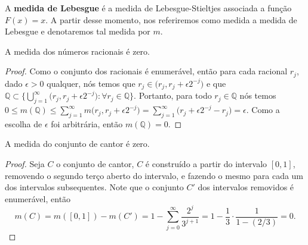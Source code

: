 \begin{definicao}
    A \textbf{medida de Lebesgue} é a medida de Lebesgue-Stieltjes associada a função $F(x)=x$. A partir desse momento, nos referiremos como medida a medida de Lebesgue e denotaremos tal medida por $m$. 
\end{definicao}

\begin{exemplo}
    A medida dos números racionais é zero.
    \begin{proof}
       Como o conjunto dos racionais é enumerável, então para cada racional $r_j$, dado $\epsilon>0$ qualquer, nós temos que $r_j \in \big(r_j,r_j + \epsilon 2^{-j} \big)$ e que $\mathbb{Q} \subset \bigg\{ \bigcup _{j=1} ^\infty \big(r_j,r_j + \epsilon 2^{-j} \big) : \forall r_j \in \mathbb{Q} \bigg\}$. Portanto, para todo $r_j \in \mathbb{Q}$ nós temos $0 \leq m (\mathbb{Q}) \leq \sum _{j=1}^\infty m \big(r_j,r_j + \epsilon 2^{-j} \big) = \sum _{j=1}^\infty \big( r_j + \epsilon 2^{-j} - r_j \big) = \epsilon$. Como a escolha de $\epsilon$ foi arbitrária, então $m(\mathbb{Q}) = 0$. 
    \end{proof}
\end{exemplo}

\begin{exemplo}
    A medida do conjunto de cantor é zero.
    \begin{proof}
        Seja $C$ o conjunto de cantor, $C$ é construído a partir do intervalo $[0,1]$, removendo o segundo terço aberto do intervalo, e fazendo o mesmo para cada um dos intervalos subsequentes. Note que o conjunto $C'$ dos intervalos removidos é enumerável, então
        \[
        m(C) = m([0,1]) - m(C') = 1 - \sum_{j=0}^\infty \frac{2^j}{3^{j+1}} = 1 - \frac{1}{3} \cdot \frac{1}{1- (2/3)} = 0.   
        \]  
    \end{proof}
\end{exemplo}

